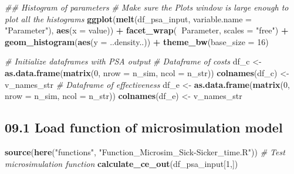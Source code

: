 \documentclass[
]{article}
\newenvironment{Shaded}{\begin{snugshade}}{\end{snugshade}}
\newcommand{\CommentTok}[1]{\textcolor[rgb]{0.56,0.35,0.01}{\textit{#1}}}
\newcommand{\DataTypeTok}[1]{\textcolor[rgb]{0.13,0.29,0.53}{#1}}
\newcommand{\DecValTok}[1]{\textcolor[rgb]{0.00,0.00,0.81}{#1}}
\newcommand{\KeywordTok}[1]{\textcolor[rgb]{0.13,0.29,0.53}{\textbf{#1}}}
\newcommand{\NormalTok}[1]{#1}
\newcommand{\OperatorTok}[1]{\textcolor[rgb]{0.81,0.36,0.00}{\textbf{#1}}}
\newcommand{\StringTok}[1]{\textcolor[rgb]{0.31,0.60,0.02}{#1}}
\begin{document}
\begin{Shaded}
\begin{Highlighting}[]
\CommentTok{## Histogram of parameters}
\CommentTok{# Make sure the Plots window is large enough to plot all the histograms}
\KeywordTok{ggplot}\NormalTok{(}\KeywordTok{melt}\NormalTok{(df_psa_input, }\DataTypeTok{variable.name =} \StringTok{"Parameter"}\NormalTok{), }\KeywordTok{aes}\NormalTok{(}\DataTypeTok{x =}\NormalTok{ value)) }\OperatorTok{+}
\StringTok{  }\KeywordTok{facet_wrap}\NormalTok{(}\OperatorTok{~}\NormalTok{Parameter, }\DataTypeTok{scales =} \StringTok{"free"}\NormalTok{) }\OperatorTok{+}
\StringTok{  }\KeywordTok{geom_histogram}\NormalTok{(}\KeywordTok{aes}\NormalTok{(}\DataTypeTok{y =}\NormalTok{ ..density..)) }\OperatorTok{+}
\StringTok{  }\KeywordTok{theme_bw}\NormalTok{(}\DataTypeTok{base_size =} \DecValTok{16}\NormalTok{)}

\CommentTok{# Initialize dataframes with PSA output }
\CommentTok{# Dataframe of costs}
\NormalTok{df_c <-}\StringTok{ }\KeywordTok{as.data.frame}\NormalTok{(}\KeywordTok{matrix}\NormalTok{(}\DecValTok{0}\NormalTok{, }
                            \DataTypeTok{nrow =}\NormalTok{ n_sim,}
                            \DataTypeTok{ncol =}\NormalTok{ n_str))}
\KeywordTok{colnames}\NormalTok{(df_c) <-}\StringTok{ }\NormalTok{v_names_str}
\CommentTok{# Dataframe of effectiveness}
\NormalTok{df_e <-}\StringTok{ }\KeywordTok{as.data.frame}\NormalTok{(}\KeywordTok{matrix}\NormalTok{(}\DecValTok{0}\NormalTok{, }
                            \DataTypeTok{nrow =}\NormalTok{ n_sim,}
                            \DataTypeTok{ncol =}\NormalTok{ n_str))}
\KeywordTok{colnames}\NormalTok{(df_e) <-}\StringTok{ }\NormalTok{v_names_str}
\end{Highlighting}
\end{Shaded}

\hypertarget{load-function-of-microsimulation-model}{%
\subsection{09.1 Load function of microsimulation
model}\label{load-function-of-microsimulation-model}}

\begin{Shaded}
\begin{Highlighting}[]
\KeywordTok{source}\NormalTok{(}\KeywordTok{here}\NormalTok{(}\StringTok{"functions"}\NormalTok{, }\StringTok{"Function_Microsim_Sick-Sicker_time.R"}\NormalTok{))}
\CommentTok{# Test microsimulation function}
\KeywordTok{calculate_ce_out}\NormalTok{(df_psa_input[}\DecValTok{1}\NormalTok{,])}
\end{Highlighting}
\end{Shaded}
\end{document}

